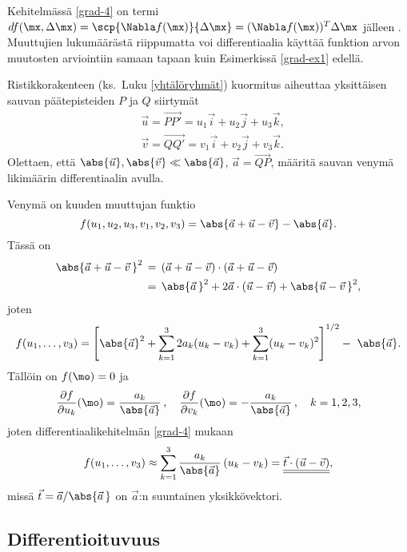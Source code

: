 Kehitelmässä \eqref{grad-4} on termi
$df(\mx,\Delta\mx) = \scp{\Nabla f(\mx)}{\Delta\mx} = (\Nabla f(\mx))^T\Delta\mx$ 
%
jälleen . Muuttujien lukumäärästä riippumatta voi differentiaalia käyttää 
funktion arvon muutosten arviointiin samaan tapaan kuin Esimerkissä \ref{grad-ex1} edellä.
\begin{Exa} Ristikkorakenteen (ks.\ Luku \ref{yhtälöryhmät}) kuormitus aiheuttaa yksittäisen 
sauvan päätepisteiden $P$ ja $Q$ siirtymät
\begin{align*}
&\vec u = \overrightarrow{PP'}=u_1\vec i+u_2\vec j+u_3\vec k, \\
&\vec v = \overrightarrow{QQ'}=v_1\vec i + v_2\vec j+v_3\vec k.
\end{align*}
Olettaen, että $\abs{\vec u},\abs{\vec v}\ll\abs{\vec a}$, $\vec a=\overrightarrow{QP}$,
määritä sauvan venymä likimäärin differentiaalin avulla.
\end{Exa}
\ratk Venymä on kuuden muuttujan funktio
\[
f(u_1,u_2,u_3,v_1,v_2,v_3) = \abs{\vec a+\vec u-\vec v}-\abs{\vec a}.
\]
Tässä on
\begin{align*}
\abs{\vec a+\vec u-\vec v\,}^2\,
             &=\,(\vec a+\vec u-\vec v)\cdot (\vec a+\vec u-\vec v) \\
             &=\,\abs{\vec a\,}^2+2\vec a\cdot(\vec u-\vec v)+\abs{\vec u-\vec v\,}^2,
\end{align*}
joten
\[
f(u_1,\ldots,v_3) 
 =\left[\abs{\vec a}^2+\sum_{k=1}^3 2a_k(u_k-v_k)+\sum_{k=1}^3 (u_k-v_k)^2\right]^{1/2}
                                                 -\ \abs{\vec a}.
\]
Tällöin on $f(\mo)=0$ ja
\[
\frac{\partial f}{\partial u_k}(\mo)
              =\frac{a_k}{\abs{\vec a}}\,,\quad \frac{\partial f}{\partial v_k}(\mo)
              =-\frac{a_k}{\abs{\vec a}}\,, \quad k=1,2,3,
\]
joten differentiaalikehitelmän \eqref{grad-4} mukaan
\[ 
f(u_1,\ldots,v_3) \approx \sum_{k=1}^3 \frac{a_k}{\abs{\vec a}}\,(u_k-v_k) 
                        = \underline{\underline{\vec t\cdot (\vec u-\vec v)}},
\]
missä $\vec t=\vec a/\abs{\vec a\,}$ on $\vec a$:n suuntainen yksikkövektori. \loppu

\subsection{Differentioituvuus}

